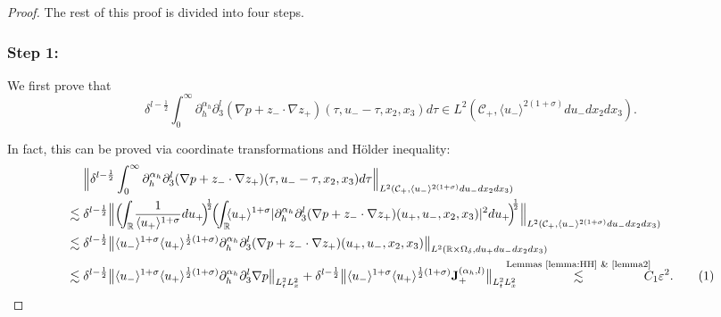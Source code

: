 \documentclass[10pt,reqno]{amsart}
\numberwithin{equation}{section}
\begin{document}
\begin{proof}
	The rest of this proof is divided into four steps. 
	
	\subsubsection*{\bf Step 1:} We first prove that 
	\begin{equation}\label{eq:lemma1-17}
		\delta^{l-\frac{1}{2}}\int_0^{\infty} \partial_h^{\alpha_h}\partial_3^l(\nabla p+z_{-}\cdot\nabla z_{+}) 
		(\tau,u_--\tau,x_2,x_3)d\tau\in L^2(\mathcal{C}_+,\langle u_-\rangle^{2(1+\sigma)}du_-dx_2dx_3).
	\end{equation}
	
	
	In fact, 
	this can be proved via coordinate transformations and H\"older inequality:
\begin{align*}
	&\ \ \ \ \Big\|\delta^{l-\frac{1}{2}}\int_0^{\infty} \partial_h^{\alpha_h}\partial_3^l(\nabla p+z_{-}\cdot\nabla z_{+}) 
	(\tau,u_--\tau,x_2,x_3)d\tau\Big\|_{L^2(\mathcal{C}_+,\langle u_-\rangle^{2(1+\sigma)}du_-dx_2dx_3)}\\
	&
	\lesssim\delta^{l-\frac{1}{2}}\Big\|\Big(\!\!\int_{\mathbb{R}}\!\frac{1}{\langle u_+\rangle^{1+\sigma}}du_+\!\Big)^{\!\!\frac{1}{2}}\!\Big(\!\!\int_{\mathbb{R}}\!\!\langle u_+\rangle^{1+\sigma} |\partial_h^{\alpha_h}\partial_3^l(\nabla p+z_{-}\cdot\nabla z_{+}) 
	(u_+,u_-,x_2,x_3)|^2du_+\!\Big)^{\!\!\frac{1}{2}}\Big\|_{L^2(\mathcal{C}_+,\langle u_-\rangle^{2(1+\sigma)}du_-dx_2dx_3)}\\
	&\lesssim\delta^{l-\frac{1}{2}}\big\|\langle u_-\rangle^{1+\sigma}\langle u_+\rangle^{\frac{1}{2}(1+\sigma)} \partial_h^{\alpha_h}\partial_3^l(\nabla p+z_{-}\cdot\nabla z_{+}) 
	(u_+,u_-,x_2,x_3)\big\|_{L^2(\mathbb{R}\times\Omega_\delta,du_+du_-dx_2dx_3)}\\
	&\lesssim\delta^{l-\frac{1}{2}}\big\|\langle u_-\rangle^{1+\sigma}\langle u_+\rangle^{\frac{1}{2}(1+\sigma)}\partial_{h}^{\alpha_h}\partial_3^l \nabla p\big\|_{L^2_tL^2_x}+\delta^{l-\frac{1}{2}}\big\|\langle u_-\rangle^{1+\sigma}\langle u_+\rangle^{\frac{1}{2}(1+\sigma)}{\mathbf{J}_+^{(\alpha_h,l)}}\big\|_{L^2_tL^2_x}\!\!\!\!\!\!\!
	\stackrel{\text{Lemmas \ref{lemma:HH} \& \ref{lemma2}}}{\lesssim}\!\!\!\!\! C_1\varepsilon^2.\stepcounter{equation}\tag{\theequation}\label{eq:lemma1-18}
\end{align*}	

	
	

\end{proof}
\end{document}
